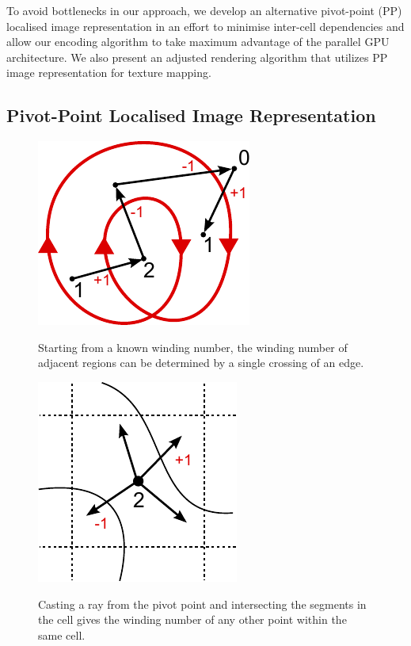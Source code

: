 \documentclass[11pt,a4paper,twoside]{article}
\begin{document}
To avoid bottlenecks in our approach, we develop an alternative pivot-point (PP) localised image representation in an effort to minimise inter-cell dependencies and allow our encoding algorithm to take maximum advantage of the parallel GPU architecture. We also present an adjusted rendering algorithm that utilizes PP image representation for texture mapping.

\subsection {Pivot-Point Localised Image Representation}

\begin {figure}
\centering
\begin {minipage} [b] {0.40\linewidth}
	\centering
	\includegraphics [width=0.6\columnwidth]{figures/ray_our}
	\caption {Starting from a known winding number, the winding number of adjacent regions can be determined by a single crossing of an edge.}
	\label {fig:ray_our}
\end {minipage}
\hspace{0.5cm}
\begin{minipage} [b] {0.40\linewidth}
	\centering
	\includegraphics [width=0.6\columnwidth]{figures/cell}
	\caption {Casting a ray from the pivot point and intersecting the segments in the cell gives the winding number of any other point within the same cell.}
	\label {fig:cell}	
\end {minipage}
\end {figure}
\end{document}
